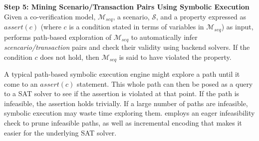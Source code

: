 \textbf{Step 5: Mining Scenario/Transaction Pairs Using Symbolic Execution}
Given a co-verification model, $\mathcal{M}_{seq}$, a scenario, 
$\mathcal{S}$, and a property expressed as $\mathit{assert}(c)$ 
(where $c$ is a condition stated in terms of variables in $\mathcal{M}_{seq}$)
as input, \verifox performs path-based exploration of $\mathcal{M}_{seq}$ 
to automatically infer {\em scencario/transaction} pairs and check their validity 
using backend solvers. If the condition $c$ does not hold, 
then $\mathcal{M}_{seq}$ is said to have violated the property. 

A typical path-based symbolic execution engine might explore 
a path until it come to an $\mathit{assert}(c)$ statement.
This whole path can then be posed as a query to a SAT solver to see if the 
assertion is violated at that point. If the path is infeasible, the assertion
holds trivially. If a large number of paths are infeasible, symbolic 
execution may waste time exploring them. \verifox employs 
an eager infeasibility check to prune infeasible paths, 
as well as incremental encoding that makes
it easier for the underlying SAT solver. 
